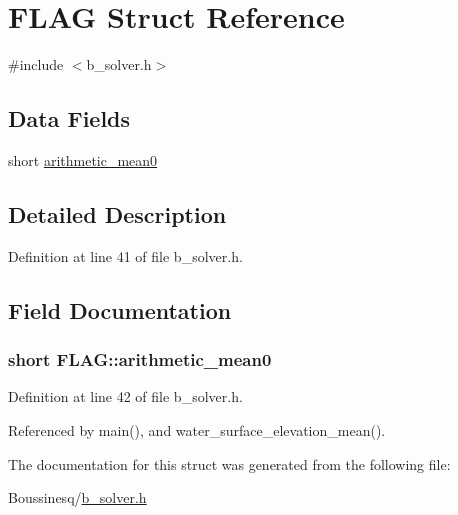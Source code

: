 \hypertarget{struct_f_l_a_g}{\section{F\-L\-A\-G Struct Reference}
\label{struct_f_l_a_g}
}


{\ttfamily \#include $<$b\-\_\-solver.\-h$>$}

\subsection*{Data Fields}
\begin{DoxyCompactItemize}
\item 
short \hyperlink{struct_f_l_a_g_a6b4efcfe15456ef81393720bf0f30763}{arithmetic\-\_\-mean0}
\end{DoxyCompactItemize}


\subsection{Detailed Description}


Definition at line 41 of file b\-\_\-solver.\-h.



\subsection{Field Documentation}
\hypertarget{struct_f_l_a_g_a6b4efcfe15456ef81393720bf0f30763}{
\subsubsection[{arithmetic\-\_\-mean0}]{\setlength{\rightskip}{0pt plus 5cm}short F\-L\-A\-G\-::arithmetic\-\_\-mean0}}\label{struct_f_l_a_g_a6b4efcfe15456ef81393720bf0f30763}


Definition at line 42 of file b\-\_\-solver.\-h.



Referenced by main(), and water\-\_\-surface\-\_\-elevation\-\_\-mean().



The documentation for this struct was generated from the following file\-:\begin{DoxyCompactItemize}
\item 
Boussinesq/\hyperlink{b__solver_8h}{b\-\_\-solver.\-h}\end{DoxyCompactItemize}
